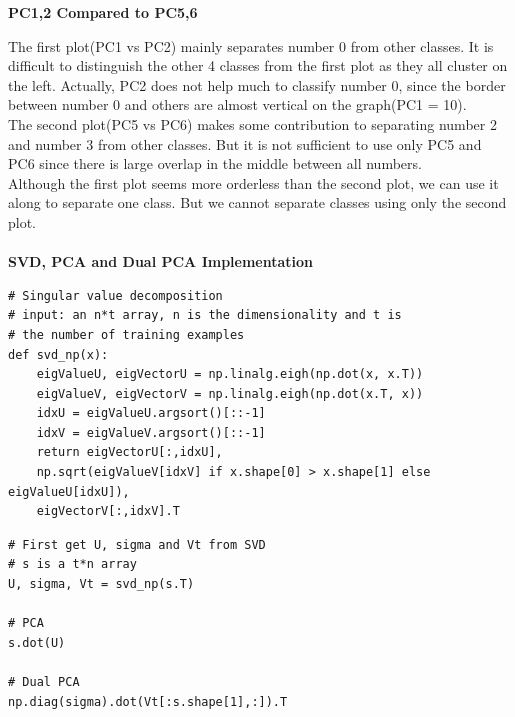 \documentclass[12pt]{article}
\begin{document}
\textbf{PC1,2 Compared to PC5,6}
\begin{figure}[H]
\captionsetup[subfigure]{labelformat=empty}
\centering
{}
\end{figure}
\vspace*{-1.5cm}
\noindent
The first plot(PC1 vs PC2) mainly separates number 0 from other classes. It is difficult to distinguish the other 4 classes from the first plot as they all cluster on the left. Actually, PC2 does not help much to classify number 0, since the border between number 0 and others are almost vertical on the graph(PC1 = 10).\\
The second plot(PC5 vs PC6) makes some contribution to separating number 2 and number 3 from other classes. But it is not sufficient to use only PC5 and PC6 since there is large overlap in the middle between all numbers.\\
Although the first plot seems more orderless than the second plot, we can use it along to separate one class. But we cannot separate classes using only the second plot.\\\\
\textbf{SVD, PCA and Dual PCA Implementation}
\begin{spacing}{1.0}
\begin{lstlisting}
# Singular value decomposition
# input: an n*t array, n is the dimensionality and t is 
# the number of training examples
def svd_np(x):
    eigValueU, eigVectorU = np.linalg.eigh(np.dot(x, x.T))
    eigValueV, eigVectorV = np.linalg.eigh(np.dot(x.T, x))
    idxU = eigValueU.argsort()[::-1]
    idxV = eigValueV.argsort()[::-1]
    return eigVectorU[:,idxU], 
    np.sqrt(eigValueV[idxV] if x.shape[0] > x.shape[1] else eigValueU[idxU]), 
    eigVectorV[:,idxV].T
\end{lstlisting}
\begin{lstlisting}
# First get U, sigma and Vt from SVD
# s is a t*n array
U, sigma, Vt = svd_np(s.T)

# PCA
s.dot(U)

# Dual PCA
np.diag(sigma).dot(Vt[:s.shape[1],:]).T
\end{lstlisting}
\end{spacing}
\end{document}
